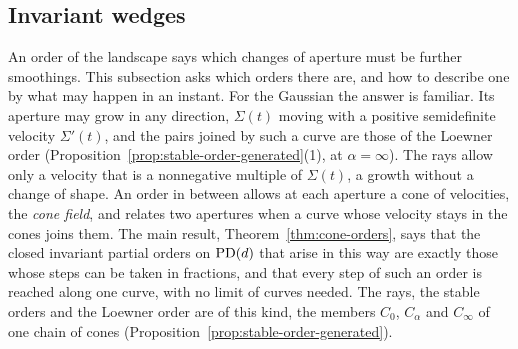 
\subsection{Invariant wedges}\label{sec:invariant-wedges}

An order of the landscape says which changes of aperture must be further smoothings. This subsection
asks which orders there are, and how to describe one by what may happen in an instant. For the
Gaussian the answer is familiar. Its aperture may grow in any direction, $\Sigma(t)$ moving with a
positive semidefinite velocity $\Sigma'(t)$, and the pairs joined by such a curve are those of the
Loewner order (Proposition~\ref{prop:stable-order-generated}(1), at $\alpha = \infty$). The rays allow
only a velocity that is a nonnegative multiple of $\Sigma(t)$, a growth without a change of shape. An
order in between allows at each aperture a cone of velocities, the \emph{cone field}, and relates two
apertures when a curve whose velocity stays in the cones joins them. The main result,
Theorem~\ref{thm:cone-orders}, says that the closed invariant partial orders on $\mathrm{PD}(d)$ that arise
in this way are exactly those whose steps can be taken in fractions, and that every step of such an
order is reached along one curve, with no limit of curves needed. The rays, the stable orders and the
Loewner order are of this kind, the members $C_0$, $C_\alpha$ and $C_\infty$ of one chain of cones
(Proposition~\ref{prop:stable-order-generated}).

